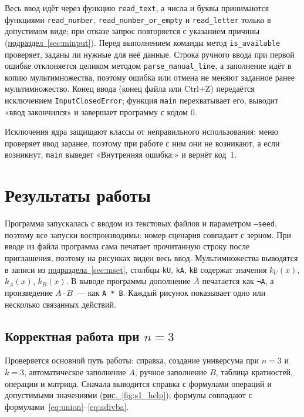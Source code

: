 \documentclass[14pt,a4paper]{extarticle}
\newcommand{\lnk}[2]{\hyperref[#1]{#2~\ref*{#1}}}
\newcommand{\figref}[1]{\lnk{fig:#1}{рис.}}
\newcommand{\code}[1]{\texttt{#1}}
\newcommand{\us}{\_\allowbreak{}}
\newcommand{\kA}{k_A(x)}
\newcommand{\kB}{k_B(x)}
\newcommand{\kU}{k_U(x)}
\begin{document}
Весь ввод идёт через функцию \code{read\us{}text}, а числа и буквы принимаются функциями \code{read\us{}number}, \code{read\us{}number\us{}or\us{}empty} и \code{read\us{}letter} только в допустимом виде; при отказе запрос повторяется с указанием причины (\lnk{sec:minput}{подраздел}). Перед выполнением команды метод \code{is\us{}available} проверяет, заданы ли нужные для неё данные. Строка ручного ввода при первой ошибке отклоняется целиком методом \code{parse\us{}manual\us{}line}, а заполнение идёт в копию мультимножества, поэтому ошибка или отмена не меняют заданное ранее мультимножество. Конец ввода (конец файла или Ctrl+Z) передаётся исключением \code{InputClosedError}; функция \code{main} перехватывает его, выводит «ввод закончился» и завершает программу с кодом 0.

Исключения ядра защищают классы от неправильного использования; меню проверяет ввод заранее, поэтому при работе с ним они не возникают, а если возникнут, \code{main} выведет «Внутренняя ошибка:» и вернёт код~1.

\section{Результаты работы}\label{sec:results}

Программа запускалась с вводом из текстовых файлов и параметром \code{--seed}, поэтому все запуски воспроизводимы: номер сценария совпадает с зерном. При вводе из файла программа сама печатает прочитанную строку после приглашения, поэтому на рисунках виден весь ввод. Мультимножества выводятся в записи из \lnk{sec:mset}{подраздела}, столбцы \code{kU}, \code{kA}, \code{kB} содержат значения $\kU$, $\kA$, $\kB$. В выводе программы дополнение $\overline{A}$ печатается как \code{¬A}, а произведение $A \cdot B$~--- как \code{A * B}. Каждый рисунок показывает одно или несколько связанных действий.

\FloatBarrier
\subsection{Корректная работа при \texorpdfstring{$n = 3$}{n = 3}}\label{sec:s1}

Проверяется основной путь работы: справка, создание универсума при $n = 3$ и $k = 3$, автоматическое заполнение $A$, ручное заполнение $B$, таблица кратностей, операции и матрица. Сначала выводится справка с формулами операций и допустимыми значениями (\figref{s1_help}); формулы совпадают с формулами~\eqref{eq:union}--\eqref{eq:adivba}.
\end{document}
